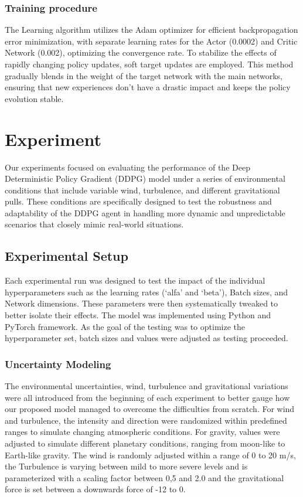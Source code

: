 \documentclass[conference]{IEEEtran}
\begin{document}
\subsubsection{Training procedure}
The Learning algorithm utilizes the Adam optimizer for efficient backpropagation error minimization, with separate learning rates for the Actor (0.0002) and Critic Network (0.002), optimizing the convergence rate.
To stabilize the effects of rapidly changing policy updates, soft target updates are employed. This method gradually blends in the weight of the target network with the main networks, ensuring that new experiences don’t have a drastic impact and keeps the policy evolution stable.

\section{Experiment}
Our experiments focused on evaluating the performance of the Deep Deterministic Policy Gradient (DDPG) model under a series of environmental conditions that include variable wind, turbulence, and different gravitational pulls. These conditions are specifically designed to test the robustness and adaptability of the DDPG agent in handling more dynamic and unpredictable scenarios that closely mimic real-world situations.

\subsection{Experimental Setup}
Each experimental run was designed to test the impact of the individual hyperparameters such as the learning rates (‘alfa’ and ‘beta’), Batch sizes, and Network dimensions. These parameters were then systematically tweaked to better isolate their effects. The model was implemented using Python and PyTorch framework. As the goal of the testing was to optimize the hyperparameter set, batch sizes and values were adjusted as testing proceeded.

\subsubsection{Uncertainty Modeling}
The environmental uncertainties, wind, turbulence and gravitational variations were all introduced from the beginning of each experiment to better gauge how our proposed model managed to overcome the difficulties from scratch. For wind and turbulence, the intensity and direction were randomized within predefined ranges to simulate changing atmospheric conditions. For gravity, values were adjusted to simulate different planetary conditions, ranging from moon-like to Earth-like gravity.
The wind is randomly adjusted within a range of 0 to 20 m/s, the Turbulence is varying between mild to more severe levels and is parameterized with a scaling factor between 0,5 and 2.0 and the gravitational force is set between a downwards force of -12 to 0. 
\end{document}
